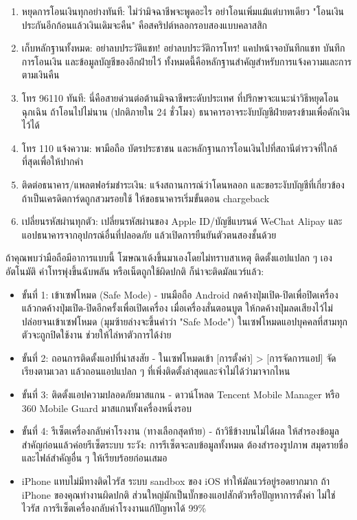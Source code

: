 \begin{enumerate}
  \item หยุดการโอนเงินทุกอย่างทันที: ไม่ว่ามิจฉาชีพจะพูดอะไร อย่าโอนเพิ่มแม้แต่บาทเดียว "โอนเงินประกันอีกก้อนแล้วเงินเดิมจะคืน" คือสคริปต์หลอกรอบสองแบบคลาสสิก
  \item เก็บหลักฐานทั้งหมด: อย่าลบประวัติแชท! อย่าลบประวัติการโทร! แคปหน้าจอบันทึกแชท บันทึกการโอนเงิน และข้อมูลบัญชีของอีกฝ่ายไว้ ทั้งหมดนี้คือหลักฐานสำคัญสำหรับการแจ้งความและการตามเงินคืน
  \item โทร 96110 ทันที: นี่คือสายด่วนต่อต้านมิจฉาชีพระดับประเทศ ที่ปรึกษาจะแนะนำวิธีหยุดโอนฉุกเฉิน ถ้าโอนไปไม่นาน (ปกติภายใน 24 ชั่วโมง) ธนาคารอาจระงับบัญชีฝ่ายตรงข้ามเพื่อดักเงินไว้ได้
  \item โทร 110 แจ้งความ: พามือถือ บัตรประชาชน และหลักฐานการโอนเงินไปที่สถานีตำรวจที่ใกล้ที่สุดเพื่อให้ปากคำ
  \item ติดต่อธนาคาร/แพลตฟอร์มชำระเงิน: แจ้งสถานการณ์ว่าโดนหลอก และขอระงับบัญชีที่เกี่ยวข้อง ถ้าเป็นเครดิตการ์ดถูกสวมรอยใช้ ให้ขอธนาคารเริ่มขั้นตอน chargeback
  \item เปลี่ยนรหัสผ่านทุกตัว: เปลี่ยนรหัสผ่านของ Apple ID/บัญชีแบรนด์ WeChat Alipay และแอปธนาคารจากอุปกรณ์อื่นที่ปลอดภัย แล้วเปิดการยืนยันตัวตนสองชั้นด้วย
\end{enumerate}


ถ้าคุณพบว่ามือถือมีอาการแบบนี้ โฆษณาเด้งขึ้นมาเองโดยไม่ทราบสาเหตุ ติดตั้งแอปแปลก ๆ เองอัตโนมัติ ค่าโทรพุ่งขึ้นฉับพลัน หรือเน็ตถูกใช้ผิดปกติ ก็น่าจะติดมัลแวร์แล้ว:

\begin{itemize}
  \item ขั้นที่ 1: เข้าเซฟโหมด (Safe Mode) - บนมือถือ Android กดค้างปุ่มเปิด-ปิดเพื่อปิดเครื่อง แล้วกดค้างปุ่มเปิด-ปิดอีกครั้งเพื่อเปิดเครื่อง เมื่อเครื่องสั่นตอนบูต ให้กดค้างปุ่มลดเสียงไว้ไม่ปล่อยจนเข้าเซฟโหมด (มุมซ้ายล่างจะขึ้นคำว่า "Safe Mode") ในเซฟโหมดแอปบุคคลที่สามทุกตัวจะถูกปิดใช้งาน ช่วยให้ไล่หาตัวการได้ง่าย
  \item ขั้นที่ 2: ถอนการติดตั้งแอปที่น่าสงสัย - ในเซฟโหมดเข้า [การตั้งค่า] > [การจัดการแอป] จัดเรียงตามเวลา แล้วถอนแอปแปลก ๆ ที่เพิ่งติดตั้งล่าสุดและจำไม่ได้ว่ามาจากไหน
  \item ขั้นที่ 3: ติดตั้งแอปความปลอดภัยมาสแกน - ดาวน์โหลด Tencent Mobile Manager หรือ 360 Mobile Guard มาสแกนทั้งเครื่องหนึ่งรอบ
  \item ขั้นที่ 4: รีเซ็ตเครื่องกลับค่าโรงงาน (ทางเลือกสุดท้าย) - ถ้าวิธีข้างบนไม่ได้ผล ให้สำรองข้อมูลสำคัญก่อนแล้วค่อยรีเซ็ตระบบ ระวัง: การรีเซ็ตจะลบข้อมูลทั้งหมด ต้องสำรองรูปภาพ สมุดรายชื่อ และไฟล์สำคัญอื่น ๆ ให้เรียบร้อยก่อนเสมอ
  \item iPhone แทบไม่มีทางติดไวรัส ระบบ sandbox ของ iOS ทำให้มัลแวร์อยู่รอดยากมาก ถ้า iPhone ของคุณทำงานผิดปกติ ส่วนใหญ่มักเป็นบั๊กของแอปสักตัวหรือปัญหาการตั้งค่า ไม่ใช่ไวรัส การรีเซ็ตเครื่องกลับค่าโรงงานแก้ปัญหาได้ 99\%
\end{itemize}

